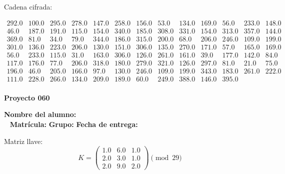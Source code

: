 \documentclass[12pt]{article}
\begin{document}
Cadena cifrada:
\begin{center}
$\begin{array}{lllllllllllll}
292.0 & 100.0 & 295.0 & 278.0 & 147.0 & 258.0 & 156.0 & 53.0 & 134.0 & 169.0 & 56.0 & 233.0 & 148.0\\
46.0 & 187.0 & 191.0 & 115.0 & 154.0 & 340.0 & 185.0 & 308.0 & 331.0 & 154.0 & 313.0 & 357.0 & 144.0\\
369.0 & 81.0 & 34.0 & 79.0 & 344.0 & 186.0 & 315.0 & 200.0 & 68.0 & 206.0 & 246.0 & 109.0 & 199.0\\
301.0 & 136.0 & 223.0 & 206.0 & 130.0 & 151.0 & 306.0 & 135.0 & 270.0 & 171.0 & 57.0 & 165.0 & 169.0\\
56.0 & 233.0 & 115.0 & 31.0 & 163.0 & 306.0 & 126.0 & 261.0 & 161.0 & 39.0 & 177.0 & 142.0 & 84.0\\
117.0 & 176.0 & 77.0 & 206.0 & 318.0 & 180.0 & 279.0 & 321.0 & 126.0 & 297.0 & 81.0 & 21.0 & 75.0\\
196.0 & 46.0 & 205.0 & 166.0 & 97.0 & 130.0 & 246.0 & 109.0 & 199.0 & 343.0 & 183.0 & 261.0 & 222.0\\
111.0 & 228.0 & 266.0 & 134.0 & 209.0 & 189.0 & 60.0 & 249.0 & 388.0 & 146.0 & 395.0\\
\end{array}$
\end{center}

\newpage


\textbf{Proyecto 060}

\textbf{Nombre del alumno:} \underline{\hspace{13cm}}\\\
\vspace{1cm}
\textbf{Matrícula:} \underline{\hspace{4cm}} \hspace{1cm}
\textbf{Grupo:} \underline{\hspace{2cm}}
\textbf{Fecha de entrega:} \underline{\hspace{2cm}}

\medskip

Matriz llave:
\[
K = \begin{pmatrix}
1.0 & 6.0 & 1.0\\
2.0 & 3.0 & 1.0\\
2.0 & 9.0 & 2.0
\end{pmatrix} \pmod{29}
\]
\end{document}
